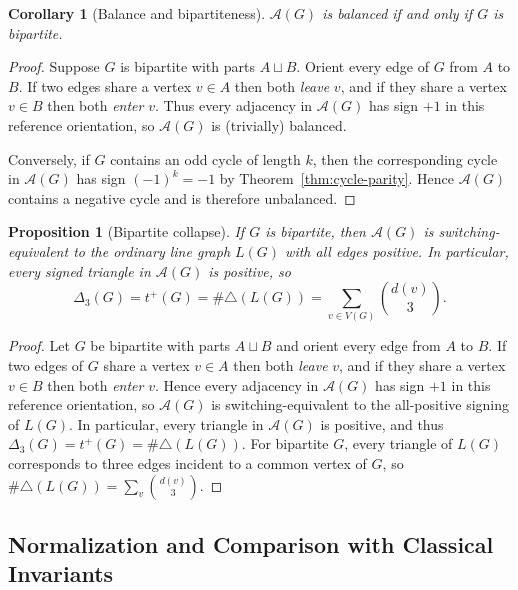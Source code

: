 \documentclass[11pt]{article}
\newtheorem{corollary}{Corollary}
\newtheorem{proposition}{Proposition}
\theoremstyle{plain}
\begin{document}
\begin{corollary}[Balance and bipartiteness]
\label{cor:balanced-iff-bipartite}
$\mathcal A(G)$ is balanced if and only if $G$ is bipartite.
\end{corollary}

\begin{proof}
Suppose $G$ is bipartite with parts $A\sqcup B$.
Orient every edge of $G$ from $A$ to $B$.
If two edges share a vertex $v\in A$ then both \emph{leave} $v$, and if they share
a vertex $v\in B$ then both \emph{enter} $v$.
Thus every adjacency in $\mathcal A(G)$ has sign $+1$ in this reference orientation,
so $\mathcal A(G)$ is (trivially) balanced.

Conversely, if $G$ contains an odd cycle of length $k$,
then the corresponding cycle in $\mathcal A(G)$
has sign $(-1)^k=-1$ by Theorem~\ref{thm:cycle-parity}.
Hence $\mathcal A(G)$ contains a negative cycle and is therefore unbalanced.
\end{proof}

\begin{proposition}[Bipartite collapse]\label{prop:bipartite-collapse}
If $G$ is bipartite, then $\mathcal A(G)$ is switching-equivalent to the ordinary line graph $L(G)$ with all edges positive. In particular, every signed triangle in $\mathcal A(G)$ is positive, so
\[
\Delta_3(G)=t^+(G)=\#\triangle(L(G))=\sum_{v\in V(G)}\binom{d(v)}{3}.
\]
\end{proposition}

\begin{proof}
Let $G$ be bipartite with parts $A\sqcup B$ and orient every edge from $A$ to $B$.
If two edges of $G$ share a vertex $v\in A$ then both \emph{leave} $v$, and if they share a
vertex $v\in B$ then both \emph{enter} $v$.
Hence every adjacency in $\mathcal A(G)$ has sign $+1$ in this reference orientation, so
$\mathcal A(G)$ is switching-equivalent to the all-positive signing of $L(G)$.
In particular, every triangle in $\mathcal A(G)$ is positive, and thus $\Delta_3(G)=t^+(G)=\#\triangle(L(G))$.
For bipartite $G$, every triangle of $L(G)$ corresponds to three edges incident to a common vertex of $G$,
so $\#\triangle(L(G))=\sum_v \binom{d(v)}{3}$.
\end{proof}

\subsection{Normalization and Comparison with Classical Invariants}
\end{document}
